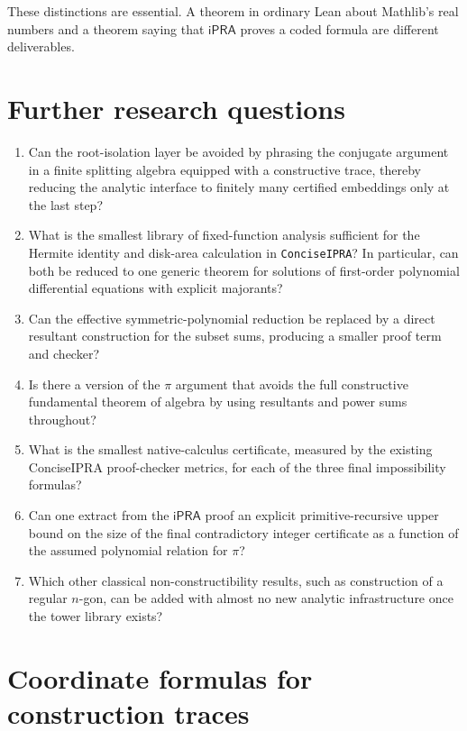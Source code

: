 \documentclass[11pt]{article}
\newcommand{\ipra}{\mathsf{iPRA}}
\begin{document}
These distinctions are essential.  A theorem in ordinary Lean about Mathlib's real numbers and a theorem saying that $\ipra$ proves a coded formula are different deliverables.

\section{Further research questions}

\begin{enumerate}
\item Can the root-isolation layer be avoided by phrasing the conjugate argument in a finite splitting algebra equipped with a constructive trace, thereby reducing the analytic interface to finitely many certified embeddings only at the last step?
\item What is the smallest library of fixed-function analysis sufficient for the Hermite identity and disk-area calculation in \texttt{ConciseIPRA}?  In particular, can both be reduced to one generic theorem for solutions of first-order polynomial differential equations with explicit majorants?
\item Can the effective symmetric-polynomial reduction be replaced by a direct resultant construction for the subset sums, producing a smaller proof term and checker?
\item Is there a version of the $\pi$ argument that avoids the full constructive fundamental theorem of algebra by using resultants and power sums throughout?
\item What is the smallest native-calculus certificate, measured by the existing ConciseIPRA proof-checker metrics, for each of the three final impossibility formulas?
\item Can one extract from the $\ipra$ proof an explicit primitive-recursive upper bound on the size of the final contradictory integer certificate as a function of the assumed polynomial relation for $\pi$?
\item Which other classical non-constructibility results, such as construction of a regular $n$-gon, can be added with almost no new analytic infrastructure once the tower library exists?
\end{enumerate}

\appendix

\section{Coordinate formulas for construction traces}
\end{document}
